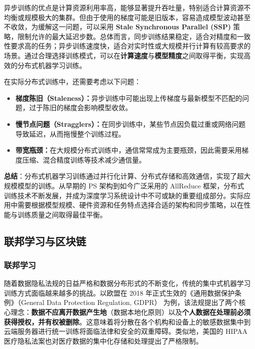\documentclass[lang=cn,newtx,10pt,scheme=chinese,chinesefont=nofont,citestyle=gb7714-2015, bibstyle=gb7714-2015]{elegantbook}
\begin{document}
\begin{refsection}
异步训练的优点是计算资源利用率高，能够显著提升吞吐量，特别适合计算资源不均衡或规模极大的集群。但由于使用的梯度可能是旧版本，容易造成模型波动甚至不收敛，为缓解这一问题，可以采用 \textbf{Stale Synchronous Parallel (SSP)} 策略，限制允许的最大延迟步数。总体而言，同步训练结果稳定，适合对精度和一致性要求高的任务；异步训练速度快，适合对实时性或大规模并行计算有较高要求的场景。通过合理选择训练模式，可以在\textbf{计算速度}与\textbf{模型精度}之间取得平衡，实现高效的分布式机器学习训练。



在实际分布式训练中，还需要考虑以下问题：
\begin{itemize}
    \item \textbf{梯度陈旧（Staleness）：}异步训练中可能出现上传梯度与最新模型不匹配的问题，过于陈旧的梯度会影响模型收敛。
    \item \textbf{慢节点问题（Stragglers）：}在同步训练中，某些节点因负载过重或网络问题导致延迟，从而拖慢整个训练过程。
    \item \textbf{带宽瓶颈：}在大规模分布式训练中，通信常常成为主要瓶颈，因此需要采用梯度压缩、混合精度训练等技术减少通信量。
\end{itemize}

\textbf{总结}：分布式机器学习训练通过并行化计算、分布式存储和高效通信，实现了超大规模模型的训练。从早期的 PS 架构到如今广泛采用的 AllReduce 框架，分布式训练技术不断发展，并成为深度学习系统设计中不可或缺的重要组成部分。实际应用中需要根据模型规模、硬件资源和任务特点选择合适的架构和同步策略，以在性能与训练质量之间取得最佳平衡。


\subsection{联邦学习与区块链}

\subsubsection{联邦学习}

随着数据隐私法规的日益严格和数据分布形式的不断变化，传统的集中式机器学习训练方式面临越来越多的挑战。以欧盟在 2018 年正式生效的《通用数据保护条例》（General Data Protection Regulation, GDPR）\cite{gdpr2016} 为例，该法规提出了两个核心理念：\textbf{数据不应离开数据产生地}（数据本地化原则）以及\textbf{个人数据在处理前必须获得授权，并有权被删除}。这意味着将分散在各个机构和设备上的敏感数据集中到云端服务器进行统一训练将面临法律和安全的双重障碍。类似地，美国的 HIPAA 医疗隐私法案\cite{hipaa1996}也对医疗数据的集中化存储和处理提出了严格限制。



\end{refsection}
\end{document}
